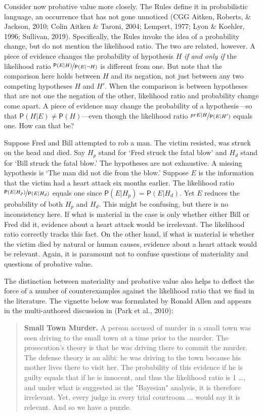 \documentclass[
  10pt,
  dvipsnames,enabledeprecatedfontcommands]{scrartcl}
\newcommand{\pr}[1]{\mathsf{P}(#1)}
\begin{document}
Consider now probative value more closely. The Rules define it in
probabilistic language, an occurrence that has not gone unnoticed (CGG
Aitken, Roberts, \& Jackson, 2010; Colin Aitken \& Taroni, 2004;
Lempert, 1977; Lyon \& Koehler, 1996; Sullivan, 2019). Specifically, the
Rules invoke the idea of a probability change, but do not mention the
likelihood ratio. The two are related, however. A piece of evidence
changes the probability of hypothesis \(H\) \textit{if and only if} the
likelihood ratio \(\nicefrac{\pr{E \vert H}}{\pr{E\vert \neg H}}\) is
different from one. But note that the comparison here holds between
\(H\) and its negation, not just between any two competing hypotheses
\(H\) and \(H'\). When the comparison is between hypotheses that are not
one the negation of the other, likelihood ratio and probability change
come apart. A piece of evidence may change the probability of a
hypothesis---so that \(\pr{H \vert E}\neq \pr{H}\)---even though the
likelihood ratio \(\nicefrac{pr{E \vert H}}{\pr{E\vert H'}}\) equals
one. How can that be?

Suppose Fred and Bill attempted to rob a man. The victim resisted, was
struck on the head and died. Say \(H_p\) stand for `Fred struck the
fatal blow' and \(H_d\) stand for `Bill struck the fatal blow.' The
hypotheses are not exhaustive. A missing hypothesis is `The man did not
die from the blow.' Suppose \(E\) is the information that the victim had
a heart attack six months earlier. The likelihood ratio
\(\nicefrac{\pr{E \vert H_p}}{\pr{E \vert H_d}}\) equals one since
\(\pr{E\vert H_p}=\pr{E\vert H_d}\). Yet \(E\) reduces the probability
of both \(H_p\) and \(H_d\). This might be confusing, but there is no
inconsistency here. If what is material in the case is only whether
either Bill or Fred did it, evidence about a heart attack would be
irrelevant. The likelihood ratio correctly tracks this fact. On the
other hand, if what is material is whether the victim died by natural or
human causes, evidence about a heart attack would be relevant. Again, it
is paramount not to confuse questions of materiality and questions of
probative value.

The distinction between materiality and probative value also helps to
deflect the force of a number of counterexamples against the likelihood
ratio that we find in the literature. The vignette below was formulated
by Ronald Allen and appears in the multi-authored discussion in (Park et
al., 2010):

\begin{quote}
    \textbf{Small Town Murder.} A person accused of murder in a small town was seen driving to the small town at a time prior to the murder. The prosecution's theory is that he was driving there to commit the murder. The defense theory is an alibi: he was driving to the town because his mother lives there to visit her. The probability of this evidence if he is guilty equals that if he is innocent, and thus the likelihood ratio is 1 \dots , and under what is suggested as the "Bayesian" analysis, it is therefore irrelevant. 
    Yet, every judge in every trial courtroom ... would say it is relevant.  And so we have a puzzle.  
    \end{quote}
\end{document}
